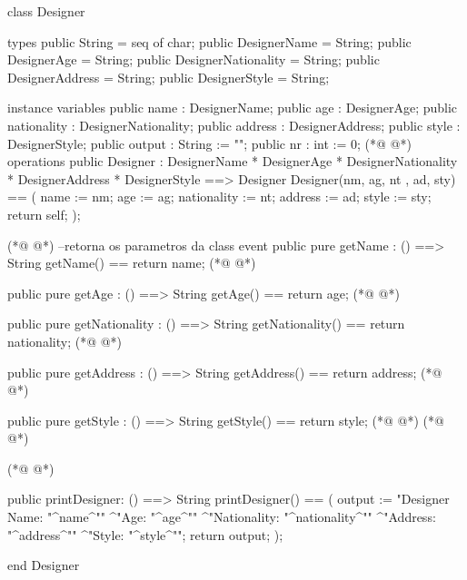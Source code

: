 \begin{vdmpp}[breaklines=true]
class Designer

types
 public String = seq of char;
 public DesignerName = String;
 public DesignerAge = String;
 public DesignerNationality = String;
 public DesignerAddress = String;
 public DesignerStyle = String;
 
instance variables
 public name : DesignerName;
 public age : DesignerAge;
 public nationality : DesignerNationality;
 public address : DesignerAddress;
 public style : DesignerStyle;
 public output : String := "";
 public nr : int := 0;
(*@
\label{Designer:19}
@*)
 operations
  public Designer : 
          DesignerName * 
          DesignerAge *
          DesignerNationality * 
          DesignerAddress * 
          DesignerStyle   ==> Designer
  Designer(nm, ag, nt , ad, sty) ==
  (
    name := nm;
    age := ag;
    nationality := nt;
    address := ad;
    style := sty;
    return self;
  );
  
(*@
\label{getName:36}
@*)
  --retorna os parametros da class event
  public pure getName : () ==> String
    getName() == return name;
(*@
\label{getAge:39}
@*)
    
   public pure getAge : () ==> String
     getAge() == return age;
(*@
\label{getNationality:42}
@*)
     
  public pure getNationality : () ==> String
     getNationality() == return nationality;
(*@
\label{getAddress:45}
@*)
     
  public pure getAddress : () ==> String
     getAddress() == return address;      
(*@
\label{getStyle:48}
@*)
     
  public pure getStyle : () ==> String
     getStyle() == return style;
(*@
\label{printDesigner:51}
@*)
(*@
\label{printModel:51}
@*)
  
(*@
\label{toString:52}
@*)
   
  public printDesigner: () ==> String
  printDesigner() == (
  output := "Designer Name: "^name^"\n"
       ^"Age: "^age^"\n"
       ^"Nationality: "^nationality^"\n"
       ^"Address: "^address^"\n"
       ^"Style: "^style^"\n";
  return output;
  );
 
     
end Designer
\end{vdmpp}
\bigskip
